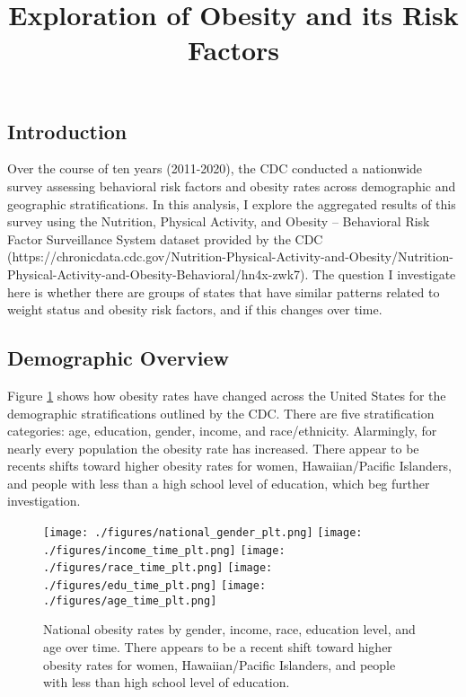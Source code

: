 \documentclass[11pt]{article}
\title{Exploration of Obesity and its Risk Factors}
\begin{document}
\maketitle

\subsection{Introduction}
Over the course of ten years (2011-2020), the CDC conducted a nationwide survey assessing behavioral risk factors and obesity rates across demographic and geographic stratifications. In this analysis, I explore the aggregated results of this survey using the Nutrition, Physical Activity, and Obesity – Behavioral Risk Factor Surveillance System dataset provided by the CDC (https://chronicdata.cdc.gov/Nutrition-Physical-Activity-and-Obesity/Nutrition-Physical-Activity-and-Obesity-Behavioral/hn4x-zwk7). The question I investigate here is whether there are groups of states that have similar patterns related to weight status and obesity risk factors, and if this changes over time. 

\subsection{Demographic Overview}
Figure \ref{fig:dems_by_time} shows how obesity rates have changed across the United States for the demographic stratifications outlined by the CDC. There are five stratification categories: age, education, gender, income, and race/ethnicity. Alarmingly, for nearly every population the obesity rate has increased. There appear to be recents shifts toward higher obesity rates for women, Hawaiian/Pacific Islanders, and people with less than a high school level of education, which beg further investigation.

\begin{figure}[hp]
\texttt{[image: ./figures/national\_gender\_plt.png]}
\texttt{[image: ./figures/income\_time\_plt.png]}
\texttt{[image: ./figures/race\_time\_plt.png]}
\texttt{[image: ./figures/edu\_time\_plt.png]}
\texttt{[image: ./figures/age\_time\_plt.png]}
\caption{
  National obesity rates by gender, income, race, education level, and age over time. There appears to be a recent shift toward higher obesity rates for women, Hawaiian/Pacific Islanders, and people with less than high school level of education. 
}
\label{fig:dems_by_time}
\end{figure}
\end{document}
